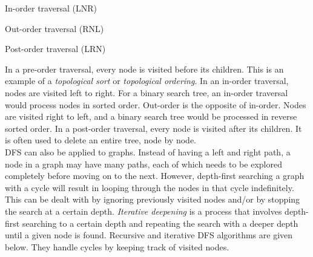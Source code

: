 \begin{algorithm}[H]
	\caption{In-order traversal (LNR)}
\end{algorithm}
\vspace{5mm}

\begin{algorithm}[H]
	\caption{Out-order traversal (RNL)}
\end{algorithm}
\vspace{5mm}

\begin{algorithm}[H]
	\caption{Post-order traversal (LRN)}
\end{algorithm}
\vspace{5mm}

In a pre-order traversal, every node is visited before its children. This is an example of a \textit{topological sort} or \textit{topological ordering}. In an in-order traversal, nodes are visited left to right. For a binary search tree, an in-order traversal would process nodes in sorted order. Out-order is the opposite of in-order. Nodes are visited right to left, and a binary search tree would be processed in reverse sorted order. In a post-order traversal, every node is visited after its children. It is often used to delete an entire tree, node by node. \\

DFS can also be applied to graphs. Instead of having a left and right path, a node in a graph may have many paths, each of which needs to be explored completely before moving on to the next. However, depth-first searching a graph with a cycle will result in looping through the nodes in that cycle indefinitely. This can be dealt with by ignoring previously visited nodes and/or by stopping the search at a certain depth. \textit{Iterative deepening} is a process that involves depth-first searching to a certain depth and repeating the search with a deeper depth until a given node is found. Recursive and iterative DFS algorithms are given below. They handle cycles by keeping track of visited nodes. \\

